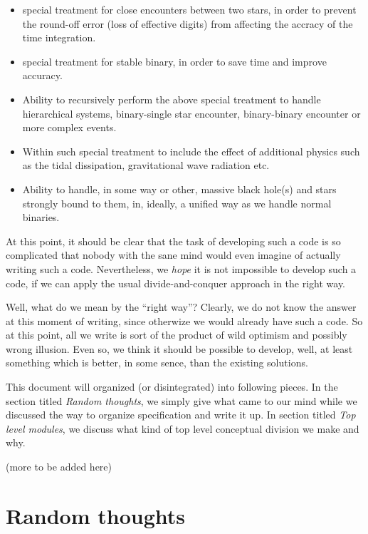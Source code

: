 \documentclass{article}[12pt]
\begin{document}
\begin{itemize}
\item special treatment for close encounters between two stars, in
order to prevent the round-off error (loss of effective digits) from
affecting the accracy of the time integration.
\item special treatment for stable binary, in order to save time and
improve accuracy.
\item Ability to recursively perform the above special treatment to
handle hierarchical systems, binary-single star encounter,
binary-binary encounter or more complex events.
\item Within such special treatment to include the effect of
additional physics such as the tidal dissipation, gravitational wave
radiation etc.
\item Ability to handle, in some way or other, massive black hole(s)
and stars strongly bound to them, in, ideally, a unified way as we
handle normal binaries.
\end{itemize}

At this point, it should be clear that the task of developing such a
code is so complicated that nobody with the sane mind would even
imagine of actually writing such a code. Nevertheless, we {\it hope}
it is not impossible to develop such a code, if we can apply the usual
divide-and-conquer approach in the right way.

Well, what do we mean by the ``right way''? Clearly, we do not know
the answer at this moment of writing, since otherwize we would already
have such a code. So at this point, all we write is sort of the
product of wild optimism and possibly wrong illusion. Even so, we
think it should be possible to develop, well, at least something which
is better, in some sence, than the existing solutions.

This document will organized (or disintegrated) into following pieces.
In the section titled {\it Random thoughts}, we simply give what came
to our mind while we discussed the way to organize specification and
write it up. In section titled {\it Top level modules}, we discuss
what kind of top level conceptual division we make and why.

(more to be added here)




\section{Random thoughts}
\end{document}

